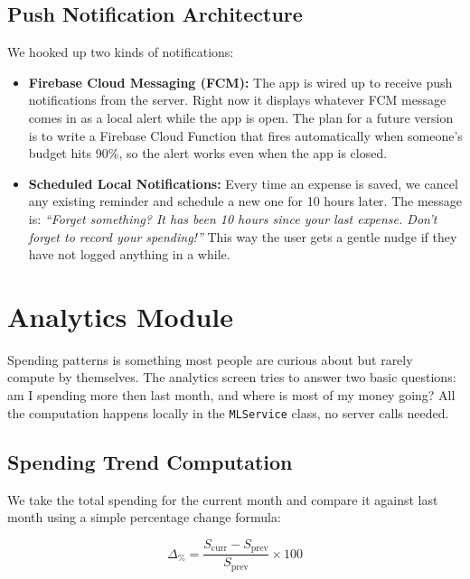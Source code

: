 \documentclass[conference]{IEEEtran}
\begin{document}
\subsection{Push Notification Architecture}

We hooked up two kinds of notifications:

\begin{itemize}
  \item \textbf{Firebase Cloud Messaging (FCM):} The app is wired up to receive push notifications from the server. Right now it displays whatever FCM message comes in as a local alert while the app is open. The plan for a future version is to write a Firebase Cloud Function that fires automatically when someone's budget hits 90\%, so the alert works even when the app is closed.
  \item \textbf{Scheduled Local Notifications:} Every time an expense is saved, we cancel any existing reminder and schedule a new one for 10 hours later. The message is: \textit{``Forget something? It has been 10 hours since your last expense. Don't forget to record your spending!''} This way the user gets a gentle nudge if they have not logged anything in a while.
\end{itemize}


\section{Analytics Module}

Spending patterns is something most people are curious about but rarely compute by themselves. The analytics screen tries to answer two basic questions: am I spending more then last month, and where is most of my money going? All the computation happens locally in the \texttt{MLService} class, no server calls needed.

\subsection{Spending Trend Computation}

We take the total spending for the current month and compare it against last month using a simple percentage change formula:

\begin{equation}
  \Delta_{\%} = \frac{S_{\text{curr}} - S_{\text{prev}}}{S_{\text{prev}}} \times 100
  \label{eq:trend}
\end{equation}
\end{document}

